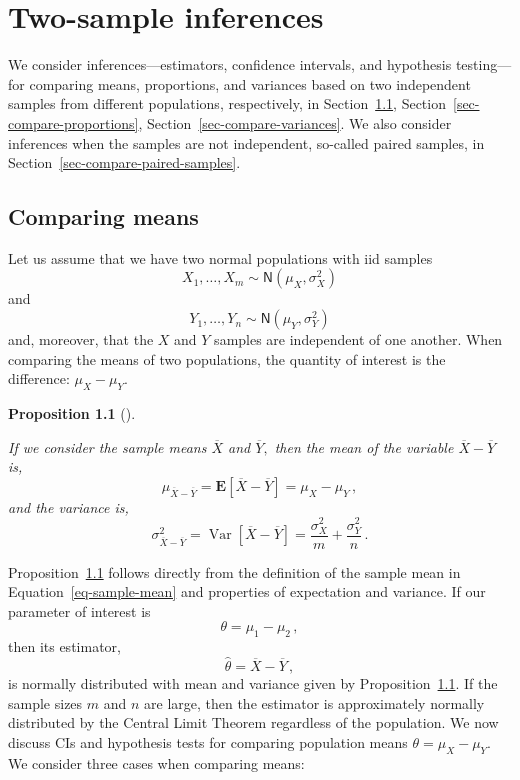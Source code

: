 \documentclass[
  a4paper,
  DIV=11,
  numbers=noendperiod,
  oneside]{scrreprt}
\theoremstyle{plain}
\theoremstyle{definition}
\theoremstyle{definition}
\theoremstyle{definition}
\theoremstyle{plain}
\newtheorem{proposition}{Proposition}[chapter]
\theoremstyle{remark}
\begin{document}
\chapter{Two-sample inferences}\label{sec-inference-two-samples}

We consider inferences---estimators, confidence intervals, and
hypothesis testing---for comparing means, proportions, and variances
based on two independent samples from different populations,
respectively, in Section~\ref{sec-compare-means},
Section~\ref{sec-compare-proportions},
Section~\ref{sec-compare-variances}. We also consider inferences when
the samples are not independent, so-called paired samples, in
Section~\ref{sec-compare-paired-samples}.

\section{Comparing means}\label{sec-compare-means}

Let us assume that we have two normal populations with iid samples \[
 X_1, \dots, X_m \sim \mathsf{N}(\mu_X, \sigma_X^2)
\] and \[
 Y_1, \dots, Y_n \sim \mathsf{N}(\mu_Y, \sigma_Y^2)
\] and, moreover, that the \(X\) and \(Y\) samples are independent of
one another. When comparing the means of two populations, the quantity
of interest is the difference: \(\mu_X - \mu_Y.\)

\begin{proposition}[]\protect\hypertarget{prp-qoi-diff-pop-means}{}\label{prp-qoi-diff-pop-means}

If we consider the sample means \(\overline{X}\) and \(\overline{Y},\)
then the mean of the variable \(\overline{X} - \overline{Y}\) is, \[
 \mu_{\overline{X} - \overline{Y}} 
= \mathbf{E}\left[ \overline{X} - \overline{Y} \right] = \mu_X - \mu_Y\,,
\] and the variance is, \[
 \sigma_{\overline{X} - \overline{Y}}^2
= \mathop{\mathrm{Var}}\left[ \overline{X} - \overline{Y} \right]
= \frac{\sigma_X^2}{m} + \frac{\sigma_Y^2}{n} \,.
\]

\end{proposition}

Proposition~\ref{prp-qoi-diff-pop-means} follows directly from the
definition of the sample mean in Equation~\ref{eq-sample-mean} and
properties of expectation and variance. If our parameter of interest is
\[
 \theta = \mu_1 - \mu_2\,,
\] then its estimator, \[
 \widehat{\theta} = \overline{X} - \overline{Y}\,,
\] is normally distributed with mean and variance given by
Proposition~\ref{prp-qoi-diff-pop-means}. If the sample sizes \(m\) and
\(n\) are large, then the estimator is approximately normally
distributed by the Central Limit Theorem regardless of the population.
We now discuss CIs and hypothesis tests for comparing population means
\(\theta = \mu_X - \mu_Y.\) We consider three cases when comparing
means:
\end{document}
